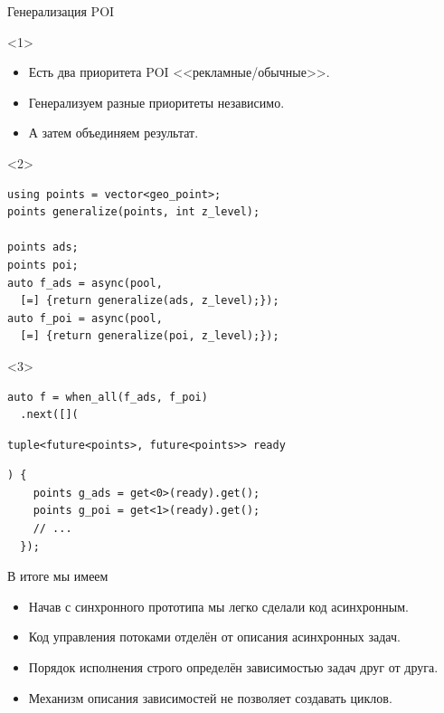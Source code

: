 \documentclass[aspectratio=169,hyperref={unicode},17pt]{beamer}
\begin{document}
\begin{frame}[fragile,t]{Генерализация POI}
\begin{onlyenv}<1>
\begin{itemize}
 \item Есть два приоритета POI <<рекламные/обычные>>.
 \item Генерализуем разные приоритеты независимо.
 \item А затем объединяем результат.
\end{itemize}
\end{onlyenv}
\begin{onlyenv}<2>
\begin{lstlisting}[style=cppcode]
using points = vector<geo_point>;
points generalize(points, int z_level);

points ads;
points poi;
auto f_ads = async(pool,
  [=] {return generalize(ads, z_level);});
auto f_poi = async(pool,
  [=] {return generalize(poi, z_level);});
\end{lstlisting}
\end{onlyenv}
\begin{onlyenv}<3>
\begin{lstlisting}[style=cppcode,belowskip=0pt]
auto f = when_all(f_ads, f_poi)
  .next([](
\end{lstlisting}
\begin{lstlisting}[style=cppcode,backgroundcolor=\color{gray!30},aboveskip=0pt,belowskip=0pt]
    tuple<future<points>, future<points>> ready
\end{lstlisting}
\begin{lstlisting}[style=cppcode,aboveskip=0pt,belowskip=0pt]
  ) {
    points g_ads = get<0>(ready).get();
    points g_poi = get<1>(ready).get();
    // ...
  });
\end{lstlisting}
\end{onlyenv}
\end{frame}

\begin{frame}[fragile,t]{В итоге мы имеем}
\begin{itemize}[<+->]
 \item Начав с синхронного прототипа мы легко сделали код асинхронным.
 \item Код управления потоками отделён от описания асинхронных задач.
 \item Порядок исполнения строго определён зависимостью задач друг от друга.
 \item Механизм описания зависимостей не позволяет создавать циклов.
\end{itemize}
\end{frame}
\end{document}
